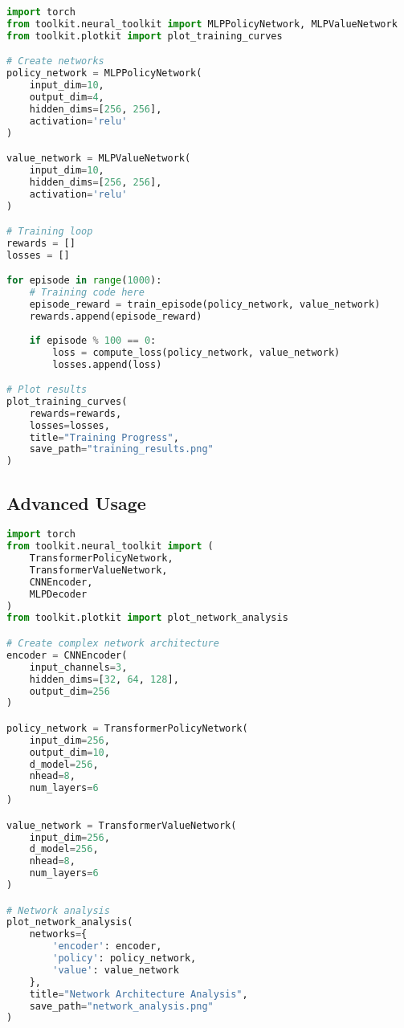 \begin{lstlisting}[language=python, caption=Basic toolkit usage]
import torch
from toolkit.neural_toolkit import MLPPolicyNetwork, MLPValueNetwork
from toolkit.plotkit import plot_training_curves

# Create networks
policy_network = MLPPolicyNetwork(
    input_dim=10,
    output_dim=4,
    hidden_dims=[256, 256],
    activation='relu'
)

value_network = MLPValueNetwork(
    input_dim=10,
    hidden_dims=[256, 256],
    activation='relu'
)

# Training loop
rewards = []
losses = []

for episode in range(1000):
    # Training code here
    episode_reward = train_episode(policy_network, value_network)
    rewards.append(episode_reward)
    
    if episode % 100 == 0:
        loss = compute_loss(policy_network, value_network)
        losses.append(loss)

# Plot results
plot_training_curves(
    rewards=rewards,
    losses=losses,
    title="Training Progress",
    save_path="training_results.png"
)
\end{lstlisting}

\subsection{Advanced Usage}

\begin{lstlisting}[language=python, caption=Advanced toolkit usage]
import torch
from toolkit.neural_toolkit import (
    TransformerPolicyNetwork,
    TransformerValueNetwork,
    CNNEncoder,
    MLPDecoder
)
from toolkit.plotkit import plot_network_analysis

# Create complex network architecture
encoder = CNNEncoder(
    input_channels=3,
    hidden_dims=[32, 64, 128],
    output_dim=256
)

policy_network = TransformerPolicyNetwork(
    input_dim=256,
    output_dim=10,
    d_model=256,
    nhead=8,
    num_layers=6
)

value_network = TransformerValueNetwork(
    input_dim=256,
    d_model=256,
    nhead=8,
    num_layers=6
)

# Network analysis
plot_network_analysis(
    networks={
        'encoder': encoder,
        'policy': policy_network,
        'value': value_network
    },
    title="Network Architecture Analysis",
    save_path="network_analysis.png"
)
\end{lstlisting}

